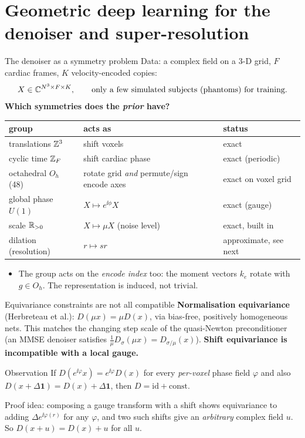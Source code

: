 \section{Geometric deep learning for the denoiser and super-resolution}

\begin{frame}{The denoiser as a symmetry problem}
Data: a complex field on a 3-D grid, $F$ cardiac frames, $K$ velocity-encoded copies:
\[ X\in\mathbb C^{N^3\times F\times K},\qquad \text{only a few simulated subjects (phantoms) for training.} \]
\pause
\textbf{Which symmetries does the \emph{prior} have?}
\begin{center}\small
\begin{tabular}{@{}lll@{}}\toprule
group & acts as & status\\\midrule
translations $\mathbb Z^3$ & shift voxels & exact\\
cyclic time $\mathbb Z_F$ & shift cardiac phase & exact (periodic)\\
octahedral $O_h$ (48) & rotate grid \emph{and} permute/sign encode axes & exact on voxel grid\\
global phase $U(1)$ & $X\mapsto e^{\ii\phi}X$ & exact (gauge)\\
scale $\mathbb R_{>0}$ & $X\mapsto\mu X$ (noise level) & exact, built in\\
dilation (resolution) & $r\mapsto sr$ & approximate, see next\\
\bottomrule\end{tabular}\end{center}
\pause
\begin{itemize}\small
\item The group acts on the \emph{encode index} too: the moment vectors $k_e$ rotate with $g\in O_h$. The representation is induced, not trivial.
\end{itemize}
\end{frame}

\begin{frame}{Equivariance constraints are not all compatible}
\textbf{Normalisation equivariance} (Herbreteau et al.): $D(\mu x)=\mu D(x)$, via bias-free, positively homogeneous nets. This matches the changing step scale of the quasi-Newton preconditioner (an MMSE denoiser satisfies $\tfrac1\mu D_\sigma(\mu x)=D_{\sigma/\mu}(x)$).
\pause
\medskip
\textbf{Shift equivariance is incompatible with a local gauge.}
\begin{block}{Observation}
If $D(e^{\ii\varphi}x)=e^{\ii\varphi}D(x)$ for every \emph{per-voxel} phase field $\varphi$ and also $D(x+\Delta\mathbf 1)=D(x)+\Delta\mathbf 1$, then $D=\mathrm{id}+\text{const}$.
\end{block}
Proof idea: composing a gauge transform with a shift shows equivariance to adding $\Delta e^{\ii\varphi(r)}$ for any $\varphi$, and two such shifts give an \emph{arbitrary} complex field $u$. So $D(x+u)=D(x)+u$ for all $u$.
\medskip
{}
\end{frame}

